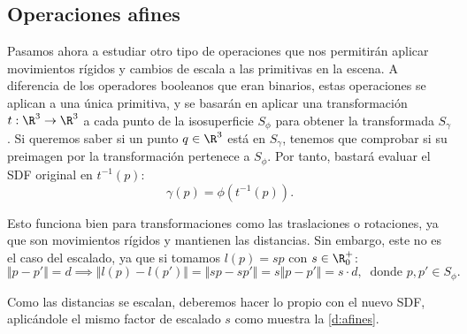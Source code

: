 \subsection{Operaciones afines}
Pasamos ahora a estudiar otro tipo de operaciones que nos permitirán aplicar movimientos rígidos y cambios de escala a las primitivas en la escena. A diferencia de los operadores booleanos que eran binarios, estas operaciones se aplican a una única primitiva, y se basarán en aplicar una transformación $t:\R^3\to \R^3$ a cada punto de la isosuperficie $S_{\phi}$ para obtener la transformada $S_{\gamma}$. Si queremos saber si un punto $q\in\R^3$ está en $S_{\gamma}$, tenemos que comprobar si su preimagen por la transformación pertenece a $S_{\phi}$. Por tanto, bastará evaluar el SDF original en $t^{-1}(p)$:
\begin{equation*}
    \gamma(p) = \phi(t^{-1}(p)).
\end{equation*}

Esto funciona bien para transformaciones como las traslaciones o rotaciones, ya que son movimientos rígidos y mantienen las distancias. Sin embargo, este no es el caso del escalado, ya que si tomamos $l(p) = sp$ con $s\in \R^+_0$:
\begin{equation*}
    \Vert p-p'\Vert = d \implies  \Vert l(p)-l(p')\Vert = \Vert sp-sp'\Vert = s\Vert p-p'\Vert = s\cdot d,\  \text{ donde } p,p' \in S_{\phi}.
\end{equation*}

Como las distancias se escalan, deberemos hacer lo propio con el nuevo SDF, aplicándole el mismo factor de escalado $s$ como muestra la \autoref{d:afines}.

